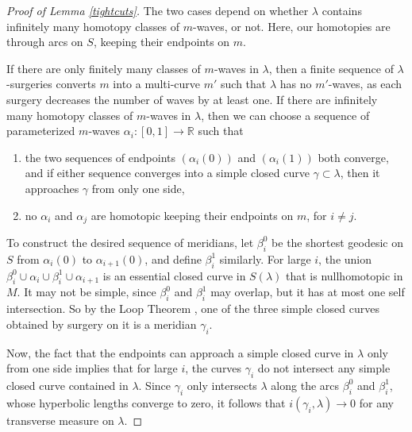 \documentclass[12pt]{amsart}
\theoremstyle{definition}
\theoremstyle{remark}
\newcommand{\BR}{\mathbb R} \newcommand{\BD}{\mathbb D}
\begin{document}
\begin {proof}[Proof of Lemma \ref{tightcuts}]
The two cases depend on whether $\lambda$ contains infinitely many  homotopy  classes of $m$-waves, or not. Here, our homotopies are through  arcs on $S$,  keeping their endpoints on $m$.

If there are only finitely many classes of $m$-waves in $\lambda$, then a finite sequence of  $\lambda $-surgeries converts $m$ into a  multi-curve $m'$ such that  $\lambda$ has no $m'$-waves,  as each surgery decreases the number of waves by at least one. %
If there are infinitely many homotopy classes  of $m$-waves in $\lambda$, then we can choose a sequence of parameterized $m$-waves $\alpha_i : [0,1] \longrightarrow \BR$ such that
\begin {enumerate}
\item the two sequences  of endpoints $(\alpha_i(0))$ and $(\alpha_i(1))$  both converge, and if either sequence converges into a simple closed curve $\gamma \subset \lambda$, then it approaches $\gamma$  from only one side,
\item no $\alpha_i $ and $\alpha_j $ are homotopic keeping their endpoints on $m$, for $i\neq j$.
\end {enumerate}
 To construct the desired sequence of meridians, let $\beta^0_i$ be the shortest geodesic on $S$ from $\alpha_i(0)$ to $\alpha_{i+1}(0)$,  and define $\beta^1_i$ similarly.  For large $i $, the union $\beta^0_i \cup \alpha_i \cup \beta^1_i \cup \alpha_{i+1}$  is an essential closed curve in $S(\lambda) $  that is nullhomotopic in $M$.  It may not be simple, since $\beta^0_i$ and $\beta^1_i$  may overlap, but it has at most one self intersection. So by the Loop Theorem \cite{Jacolectures}, one of the three simple closed curves obtained by surgery on it is a meridian $\gamma_i$. 

Now,  the fact that the endpoints can approach a simple closed curve in $\lambda$ only from one side  implies that for large $i $, the curves $\gamma_i$  do not intersect any simple closed curve contained in $\lambda$.  Since $\gamma_i$  only intersects $\lambda $ along the arcs $\beta^0_i$ and $\beta^1_i$, whose  hyperbolic lengths converge to zero,  it follows that $i(\gamma_i,\lambda) \to 0$  for any transverse measure on $\lambda$.
\end{proof}
\end{document}
